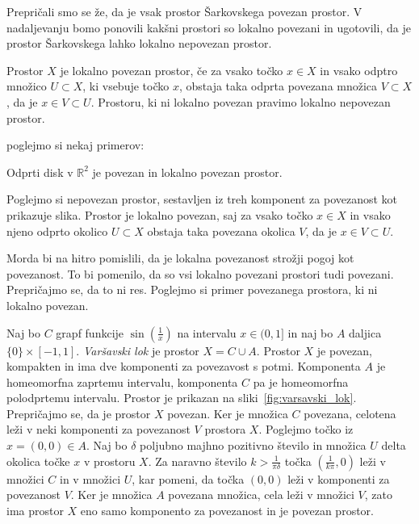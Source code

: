 \documentclass[mat2]{fmfdelo}
\newcommand{\R}{\mathbb R}
\begin{document}
Prepričali smo se že, da je vsak prostor Šarkovskega povezan prostor. V nadaljevanju bomo ponovili kakšni prostori so lokalno povezani in ugotovili, da je prostor Šarkovskega lahko lokalno nepovezan prostor.

\begin{definicija}
Prostor $X$ je lokalno povezan prostor, če za vsako točko $x \in X$ in vsako odptro množico $U \subset X$, ki vsebuje točko $x$, obstaja taka odprta povezana množica $V \subset X$, da je $x \in V \subset U$. Prostoru, ki ni lokalno povezan pravimo lokalno nepovezan prostor.
\end{definicija}

poglejmo si nekaj primerov:
\begin{primer}
Odprti disk v $\R^2$ je povezan in lokalno povezan prostor.
\end{primer}

\begin{primer}
Poglejmo si nepovezan prostor, sestavljen iz treh komponent za povezanost kot prikazuje slika. Prostor je lokalno povezan, saj za vsako točko $x \in X$ in vsako njeno odprto okolico $U\subset X$ obstaja taka povezana okolica $V$, da je $x \in V \subset U$.
\end{primer}

Morda bi na hitro pomislili, da je lokalna povezanost strožji pogoj kot povezanost. To bi pomenilo, da so vsi lokalno povezani prostori tudi povezani. Prepričajmo se, da to ni res. Poglejmo si primer povezanega prostora, ki ni lokalno povezan.

\begin{primer}
Naj bo $C$ grapf funkcije $\sin\left(\frac{1}{x}\right)$ na intervalu $x \in (0 , 1]$ in naj bo $A$ daljica $\{ 0 \} \times [-1 , 1]$. \emph{Varšavski lok} je prostor $X = C \cup A$.
Prostor $X$ je povezan, kompakten in ima dve komponenti za povezavost s potmi. Komponenta $A$ je homeomorfna zaprtemu intervalu, komponenta $C$ pa je homeomorfna polodprtemu intervalu. Prostor je prikazan na sliki~\ref{fig:varsavski_lok}.
Prepričajmo se, da je prostor $X$ povezan. Ker je množica $C$ povezana, celotena leži v neki komponenti za povezanost $V$ prostora $X$. Poglejmo točko iz $x = (0, 0) \in  A$. Naj bo $\delta$ poljubno majhno pozitivno število in množica $U$ delta okolica točke $x$ v prostoru $X$. Za naravno število $k > \frac{1}{\pi \delta}$ točka $(\frac{1}{k \pi}, 0)$ leži v množici $C$ in v množici $U$, kar pomeni, da točka $(0, 0)$ leži v komponenti za povezanost $V$. Ker je množica $A$ povezana množica, cela leži v množici $V$, zato ima prostor $X$ eno samo komponento za povezanost in je povezan prostor.
\end{primer}
\end{document}
